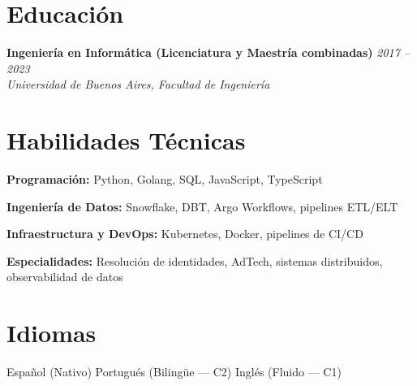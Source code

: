 \documentclass[10pt,a4paper]{article}
\newcommand{\cventry}[3]{%
  \textbf{#1} \hfill \textit{#3}\\[3pt]
  \textit{#2}%
}
\begin{document}
\section*{Educación}

\cventry{Ingeniería en Informática (Licenciatura y Maestría combinadas)}%
  {Universidad de Buenos Aires, Facultad de Ingeniería}{2017 -- 2023}

\section*{Habilidades Técnicas}

\textbf{Programación:} Python, Golang, SQL, JavaScript, TypeScript

\textbf{Ingeniería de Datos:} Snowflake, DBT, Argo Workflows, pipelines ETL/ELT

\textbf{Infraestructura y DevOps:} Kubernetes, Docker, pipelines de CI/CD

\textbf{Especialidades:} Resolución de identidades, AdTech, sistemas distribuidos,
observabilidad de datos

\section*{Idiomas}

Español (Nativo)
\quad\textperiodcentered\quad Portugués (Bilingüe --- C2)
\quad\textperiodcentered\quad Inglés (Fluido --- C1)
\end{document}
